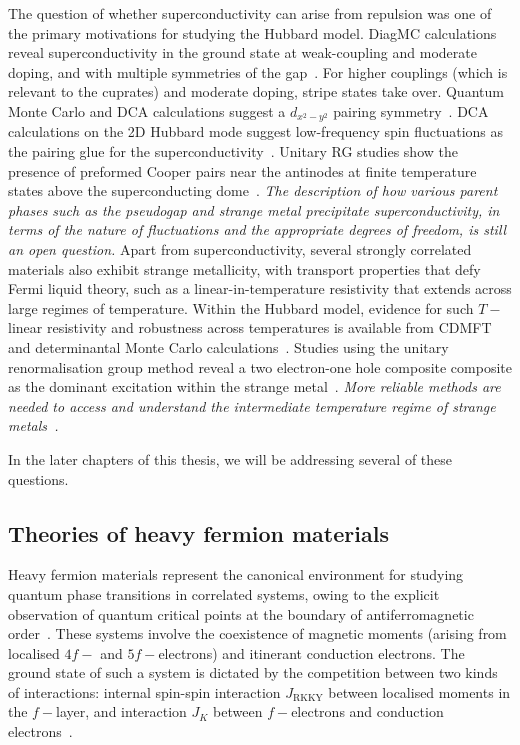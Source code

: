The question of whether superconductivity can arise from repulsion was one of the primary motivations for studying the Hubbard model. DiagMC calculations reveal superconductivity in the ground state at weak-coupling and moderate doping, and with multiple symmetries of the gap~\cite{deng_2015,simkovic_2021}. For higher couplings (which is relevant to the cuprates) and moderate doping, stripe states take over. Quantum Monte Carlo and DCA calculations suggest a \(d_{x^2 - y^2}\) pairing symmetry~\cite{white1989,chen_2015}. DCA calculations on the 2D Hubbard mode suggest low-frequency spin fluctuations as the pairing glue for the superconductivity~\cite{gull_2014}. Unitary RG studies show the presence of preformed Cooper pairs near the antinodes at finite temperature states above the superconducting dome~\cite{anirbanmott2}. {\it The description of how various parent phases such as the pseudogap and strange metal precipitate superconductivity, in terms of the nature of fluctuations and the appropriate degrees of freedom, is still an open question.} Apart from superconductivity, several strongly correlated materials also exhibit strange metallicity, with transport properties that defy Fermi liquid theory, such as a linear-in-temperature resistivity that extends across large regimes of temperature. Within the Hubbard model, evidence for such \(T-\)linear resistivity and robustness across temperatures is available from CDMFT and determinantal Monte Carlo calculations~\cite{cha_2020,huang_2019}. Studies using the unitary renormalisation group method reveal a two electron-one hole composite composite as the dominant excitation within the strange metal~\cite{anirbanmott2}. {\it More reliable methods are needed to access and understand the intermediate temperature regime of strange metals~\cite{qin2022,vucicevic_2019}.}

In the later chapters of this thesis, we will be addressing several of these questions.

\subsection{Theories of heavy fermion materials}
Heavy fermion materials represent the canonical environment for studying quantum phase transitions in correlated systems, owing to the explicit observation of quantum critical points at the boundary of antiferromagnetic order~\cite{lohneysen_2007}. These systems involve the coexistence of magnetic moments (arising from localised \(4f-\) and \(5f-\)electrons) and itinerant conduction electrons. The ground state of such a system is dictated by the competition between two kinds of interactions: internal spin-spin interaction \(J_\text{RKKY}\) between localised moments in the \(f-\)layer, and interaction \(J_K\) between \(f-\)electrons and conduction electrons~\cite{doniach_1977}. 

